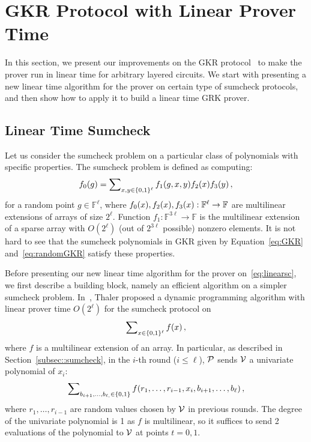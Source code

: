 \section{GKR Protocol with Linear Prover Time}
\label{sec::gkrlin}

In this section, we present our improvements on the GKR protocol~\cite{GKR} to make the prover run in linear time for arbitrary layered circuits. We start with presenting a new linear time algorithm for the prover on certain type of sumcheck protocols, and then show how to apply it to build a linear time GRK prover.

\subsection{Linear Time Sumcheck}

Let us consider the sumcheck problem on a particular class of polynomials with specific properties. The sumcheck problem is defined as computing:
\begin{equation}\label{eq:linearsc}
f_0(g) = \sum\nolimits_{x,y\in\binary^\ell}f_1(g,x,y)f_2(x)f_3(y)\, ,
\end{equation}
for a random point $g\in\mathbb{F}^\ell$, where $f_0(x), f_2(x),f_3(x): \F^\ell\rightarrow \F$ are multilinear extensions of arrays of size $2^\ell$. Function $f_1:\mathbb{F}^{3\ell}\rightarrow\mathbb{F}$ is the multilinear extension of a sparse array with $O(2^\ell)$ (out of $2^{3\ell}$ possible) nonzero elements. 
It is not hard to see that the sumcheck polynomials in GKR given by Equation~\ref{eq:GKR} and~\ref{eq:randomGKR} satisfy these properties.

Before presenting our new linear time algorithm for the prover on~\ref{eq:linearsc}, we first describe a building block, namely an efficient algorithm on a simpler sumcheck problem. In~\cite{JT_Thesis}, Thaler proposed a dynamic programming algorithm with linear prover time $O(2^\ell)$ for the sumcheck protocol on $$\sum\nolimits_{x\in\binary^\ell}f(x)\, ,$$ where $f$ is a multilinear extension of an array. In particular, as described in Section~\ref{subsec::sumcheck}, in the $i$-th round ($i\le \ell$), $\P$ sends $\V$ a univariate polynomial of $x_i$: $$\sum\nolimits_{b_{i+1}, \ldots,b_{\ell, }\in\binary}f(r_1,\ldots, r_{i-1}, x_{i}, b_{i+1},\ldots, b_{\ell})\, ,$$ where $r_1, \ldots, r_{i-1}$ are random values chosen by $\V$ in previous rounds. The degree of the univariate polynomial is 1 as $f$ is multilinear, so it suffices to send 2 evaluations of the polynomial to $\V$ at points $t = 0,1$. 

